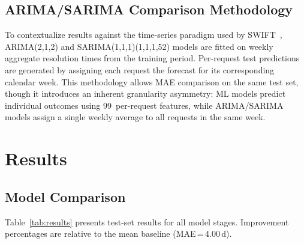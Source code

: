 \documentclass[sigconf,nonacm]{acmart}
\begin{document}
\subsection{ARIMA/SARIMA Comparison Methodology}
\label{sec:arima_method}

To contextualize results against the time-series paradigm used by
SWIFT~\cite{raj2021swift}, ARIMA(2,1,2) and
SARIMA(1,1,1)(1,1,1,52) models are fitted on weekly aggregate
resolution times from the training period. Per-request test
predictions are generated by assigning each request the forecast
for its corresponding calendar week. This methodology allows
MAE comparison on the same test set, though it introduces an
inherent granularity asymmetry: ML models predict individual
outcomes using 99~per-request features, while ARIMA/SARIMA models
assign a single weekly average to all requests in the same week.

\section{Results}
\label{sec:results}

\subsection{Model Comparison}

Table~\ref{tab:results} presents test-set results for all model
stages. Improvement percentages are relative to the mean baseline
(MAE\,=\,4.00\,d).
\end{document}
